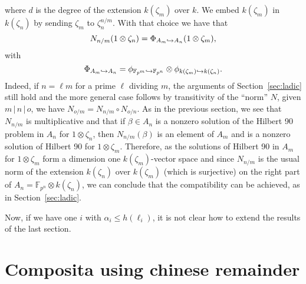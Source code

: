 \documentclass[a4paper,11pt]{article}
\begin{document}
where $d$ is the degree of the extension $k(\zeta_m)$ over $k$. We embed
$k(\zeta_m)$ in $k(\zeta_n)$ by sending $\zeta_m$ to $\zeta_n^{n/m}$. With that
choice we have that
\[
  N_{n/m}(1\otimes\zeta_n) = \Phi_{A_m\hookrightarrow A_n}(1\otimes\zeta_m),
\]
with 
\[
  \Phi_{A_m\hookrightarrow
  A_n}=\phi_{\mathbb{F}_{p^m}\hookrightarrow\mathbb{F}_{p^n}}\otimes\phi_{k(\zeta_m)\hookrightarrow
  k(\zeta_n)}.
\]
Indeed, if $n = \ell m$ for a prime $\ell$ dividing $m$, the arguments of
Section~\ref{sec:ladic} still hold and the more general case follows by
transitivity of the ``norm'' $N$, \ie given $m\,|\,n\,|\,o$, we have
$N_{o/m}=N_{n/m}\circ N_{o/n}$. As in the previous section, we see that
$N_{n/m}$ is multiplicative and that if $\beta\in A_n$ is a nonzero solution of
the Hilbert 90 problem in $A_n$ for $1\otimes\zeta_n$, then $N_{n/m}(\beta)$ is
an element of $A_m$ and is a nonzero solution of Hilbert 90 for
$1\otimes\zeta_m$. Therefore, as the solutions of Hilbert 90 in $A_m$ for
$1\otimes\zeta_m$ form a dimension one $k(\zeta_m)$-vector space and since
$N_{n/m}$ is the usual norm of the extension $k(\zeta_n)$ over $k(\zeta_m)$
(which is surjective) on the right part of $A_n=\mathbb{F}_{p^n}\otimes
k(\zeta_n)$, we can conclude that the compatibility can be achieved, as in
Section~\ref{sec:ladic}.

Now, if we have one $i$ with $\alpha_i\leq h(\ell_i)$, it is not clear how to
extend the results of the last section.

\section{Composita using chinese remainder}
\label{sec:comp-crt}
\end{document}
